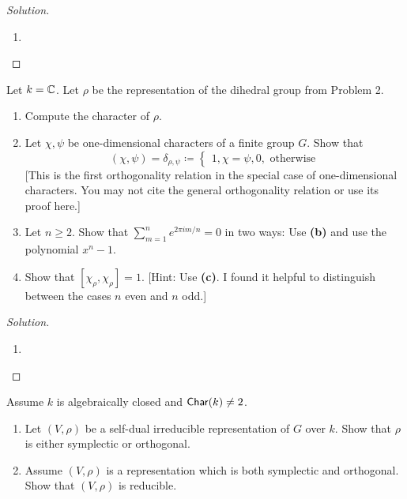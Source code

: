 \begin{proof}[Solution]
\hfill
\begin{enumerate}[font=\normalfont,label=\textbf{(\alph*)}, wide]
\item
\end{enumerate}
\end{proof}

\newpage



\begin{problem}
Let $k = \mathbb{C}$. Let $\rho$ be the representation of the dihedral group from Problem 2. 

\begin{enumerate}[font=\normalfont,label=\textbf{(\alph*)}]
\item Compute the character of $\rho$. 

\item Let $\chi, \psi$ be one-dimensional characters of a finite group $G$. Show that 
\[
(\chi, \psi) = \delta_{\rho, \psi} \coloneqq 
\begin{cases}
1, \chi = \psi, 
0, \text{ otherwise}
\end{cases}
\]
[This is the first orthogonality relation in the special case of one-dimensional characters. You may not cite the general orthogonality relation or use its proof here.]
\item Let $n \geq 2$. Show that $\sum_{m=1}^n e^{2\pi im/n} = 0$ in two ways: Use \textbf{(b)} and use the polynomial $x^n-1$. 
\item Show that $[\chi_\rho, \chi_\rho] = 1$. [Hint: Use \textbf{(c)}. I found it helpful to distinguish between the cases $n$ even and $n$ odd.]
\end{enumerate}
\end{problem}

\begin{proof}[Solution]
\hfill
\begin{enumerate}[font=\normalfont,label=\textbf{(\alph*)}, wide]
\item
\end{enumerate}
\end{proof}

\newpage


\begin{problem}
Assume $k$ is algebraically closed and $\mathsf{Char}(k) \neq 2$. 

\begin{enumerate}[font=\normalfont,label=\textbf{(\alph*)}]
\item Let $(V, \rho)$ be a self-dual irreducible representation of $G$ over $k$. Show that $\rho$ is either symplectic or orthogonal.

\item Assume $(V, \rho)$ is a representation which is both symplectic and orthogonal. Show that $(V, \rho)$ is reducible. 

\end{enumerate}
\end{problem}

